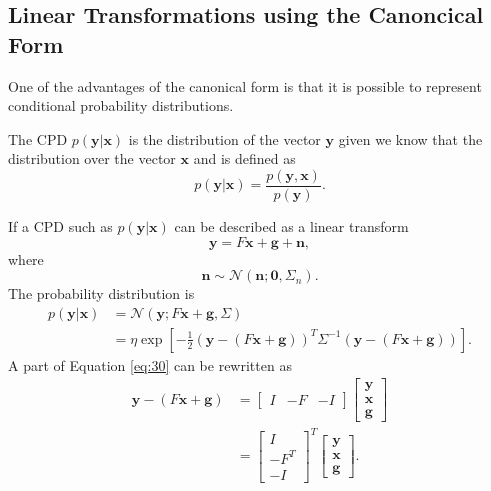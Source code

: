 \documentclass[12pt,oneside,openany,a4paper, %
afrikaans,english,
]{memoir}
\numberwithin{equation}{chapter}
\begin{document}
\subsection{Linear Transformations using the Canoncical Form}
One of the advantages of the canonical form is that it is possible to represent conditional probability distributions.

The CPD $p(\bm{y}|\bm{x})$ is the distribution of the vector $\bm{y}$ given we know that the distribution over the vector $\bm{x}$ and is defined as
\begin{equation}
p(\bm{y}|\bm{x}) = \frac{p(\bm{y},\bm{x})}{p(\bm{y})}.
\end{equation}

If a CPD such as $p(\bm{y}|\bm{x})$ can be described as a linear transform
\begin{equation}
\bm{y} = F\bm{x} + \bm{g} + \bm{n},
\end{equation}
where
\begin{equation}
\bm{n} \sim \mathcal{N}(\bm{n}; \bm{0}, \Sigma_n).
\end{equation}
The probability distribution is
\begin{equation}
\label{eq:30}
\begin{split}
p(\bm{y}|\bm{x}) & = \mathcal{N}(\bm{y}; F\bm{x} + \bm{g}, \Sigma) \\
& = \eta\exp\left[-\frac{1}{2}(\bm{y} - (F\bm{x} + \bm{g}))^T\Sigma^{-1}(\bm{y}-(F\bm{x} + \bm{g}))\right].
\end{split}
\end{equation}
A part of Equation \ref{eq:30} can be rewritten as 
\begin{equation}\label{eq: rewrite}
\begin{split}
\bm{y} - (F\bm{x} + \bm{g}) & =
\begin{bmatrix}
I&-F&-I
\end{bmatrix}
\begin{bmatrix}
\bm{y}\\
\bm{x}\\
\bm{g}
\end{bmatrix}\\
& =
\begin{bmatrix}
I\\-F^T\\-I
\end{bmatrix}^T
\begin{bmatrix}
\bm{y}\\
\bm{x}\\
\bm{g}
\end{bmatrix}.
\end{split}
\end{equation}
\end{document}
